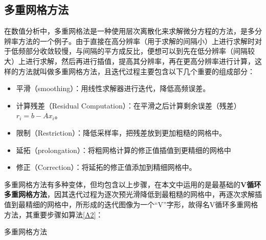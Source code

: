 \documentclass{article} %
\begin{document}
\subsection{多重网格方法}
在数值分析中，多重网格法是一种使用层次离散化来求解微分方程的方法，是多分辨率方法的一个例子。由于直接在高分辨率（用于求解的间隔小）上进行求解时对于低频部分收敛较慢，与间隔的平方成反比，便想可以到先在低分辨率（间隔较大）上进行求解，然后再进行插值，提高其分辨率，再在更高分辨率进行计算，这样的方法就叫做多重网格方法，且迭代过程主要包含以下几个重要的组成部分：
\begin{itemize}
    \item 平滑（smoothing）：用线性求解器进行迭代，降低高频误差。
    \item 计算残差（Residual Computation）：在平滑之后计算剩余误差（残差）$r_i=b-Ax_i$。
    \item 限制（Restriction）：降低采样率，把残差放到更加粗糙的网格中。
    \item 延拓（prolongation）：将粗网格计算的修正值插值到更精细的网格中
    \item 修正（Correction）：将延拓的修正值添加到精细网格中。
\end{itemize}

多重网格方法有多种变体，但均包含以上步骤，在本文中运用的是最基础的\textbf{V循环多重网格方法}，因其迭代过程为逐次预光滑降低到最粗糙的网格中，再逐次求解插值到最精细的网格中，所形成的迭代图像为一个“V”字形，故得名V循环多重网格方法，其重要步骤如算法\ref{A2}：
\begin{algorithm}
    \LinesNumbered
    \caption{多重网格方法}
    \label{A2}
\end{algorithm}
\end{document}
